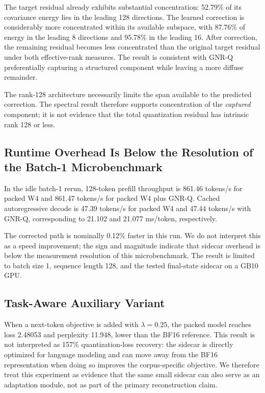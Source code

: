 \documentclass[11pt]{article}
\begin{document}
The target residual already exhibits substantial concentration: 52.79\% of its covariance energy lies in the leading 128 directions. The learned correction is considerably more concentrated within its available subspace, with 87.76\% of energy in the leading 8 directions and 95.78\% in the leading 16. After correction, the remaining residual becomes less concentrated than the original target residual under both effective-rank measures. The result is consistent with GNR-Q preferentially capturing a structured component while leaving a more diffuse remainder.

The rank-128 architecture necessarily limits the span available to the predicted correction. The spectral result therefore supports concentration of the \emph{captured} component; it is not evidence that the total quantization residual has intrinsic rank 128 or less.

\subsection{Runtime Overhead Is Below the Resolution of the Batch-1 Microbenchmark}

In the idle batch-1 rerun, 128-token prefill throughput is 861.46 tokens/s for packed W4 and 861.47 tokens/s for packed W4 plus GNR-Q. Cached autoregressive decode is 47.39 tokens/s for packed W4 and 47.44 tokens/s with GNR-Q, corresponding to 21.102 and 21.077 ms/token, respectively.

The corrected path is nominally 0.12\% faster in this run. We do not interpret this as a speed improvement; the sign and magnitude indicate that sidecar overhead is below the measurement resolution of this microbenchmark. The result is limited to batch size 1, sequence length 128, and the tested final-state sidecar on a GB10 GPU.

\subsection{Task-Aware Auxiliary Variant}

When a next-token objective is added with $\lambda=0.25$, the packed model reaches loss 2.48053 and perplexity 11.948, lower than the BF16 reference. This result is not interpreted as 157\% quantization-loss recovery: the sidecar is directly optimized for language modeling and can move away from the BF16 representation when doing so improves the corpus-specific objective. We therefore treat this experiment as evidence that the same small sidecar can also serve as an adaptation module, not as part of the primary reconstruction claim.
\end{document}
